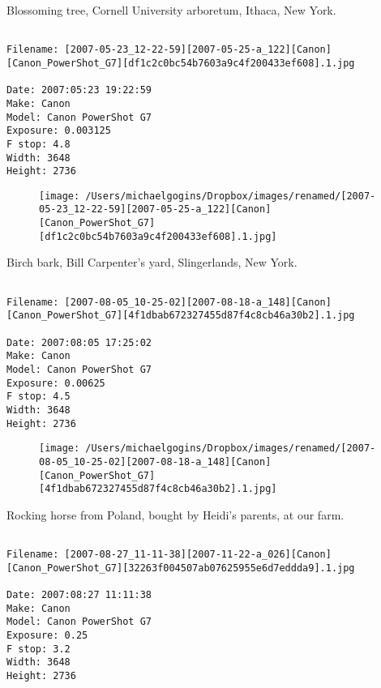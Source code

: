 \clearpage
\onecolumn
\noindent Blossoming tree, Cornell University arboretum, Ithaca, New York.
\noindent
\begin{lstlisting}

Filename: [2007-05-23_12-22-59][2007-05-25-a_122][Canon][Canon_PowerShot_G7][df1c2c0bc54b7603a9c4f200433ef608].1.jpg

Date: 2007:05:23 19:22:59
Make: Canon
Model: Canon PowerShot G7
Exposure: 0.003125
F stop: 4.8
Width: 3648
Height: 2736
\end{lstlisting}
\clearpage

\begin{figure}
\texttt{[image: /Users/michaelgogins/Dropbox/images/renamed/[2007-05-23\_12-22-59][2007-05-25-a\_122][Canon][Canon\_PowerShot\_G7][df1c2c0bc54b7603a9c4f200433ef608].1.jpg]}
\end{figure}
    
\clearpage
\onecolumn
\noindent Birch bark, Bill Carpenter's yard, Slingerlands, New York.
\noindent
\begin{lstlisting}

Filename: [2007-08-05_10-25-02][2007-08-18-a_148][Canon][Canon_PowerShot_G7][4f1dbab672327455d87f4c8cb46a30b2].1.jpg

Date: 2007:08:05 17:25:02
Make: Canon
Model: Canon PowerShot G7
Exposure: 0.00625
F stop: 4.5
Width: 3648
Height: 2736
\end{lstlisting}
\clearpage

\begin{figure}
\texttt{[image: /Users/michaelgogins/Dropbox/images/renamed/[2007-08-05\_10-25-02][2007-08-18-a\_148][Canon][Canon\_PowerShot\_G7][4f1dbab672327455d87f4c8cb46a30b2].1.jpg]}
\end{figure}
    
\clearpage
\onecolumn
\noindent Rocking horse from Poland, bought by Heidi's parents, at our farm.
\noindent
\begin{lstlisting}

Filename: [2007-08-27_11-11-38][2007-11-22-a_026][Canon][Canon_PowerShot_G7][32263f004507ab07625955e6d7eddda9].1.jpg

Date: 2007:08:27 11:11:38
Make: Canon
Model: Canon PowerShot G7
Exposure: 0.25
F stop: 3.2
Width: 3648
Height: 2736
\end{lstlisting}
\clearpage

